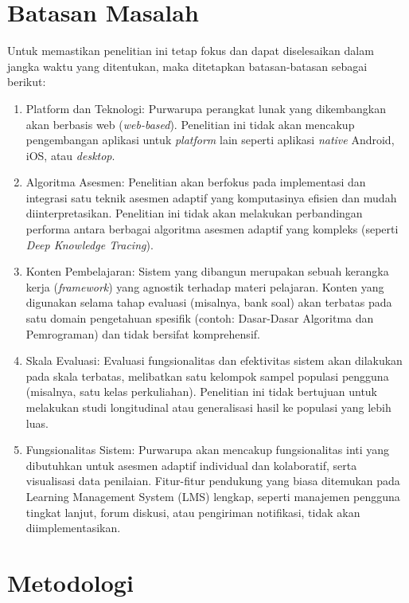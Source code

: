 \documentclass[12pt,a4paper,oneside]{book}
\begin{document}
\section{Batasan Masalah}
Untuk memastikan penelitian ini tetap fokus dan dapat diselesaikan dalam jangka waktu yang ditentukan, maka ditetapkan batasan-batasan sebagai berikut:
\begin{enumerate}
  \item Platform dan Teknologi: Purwarupa perangkat lunak yang dikembangkan akan berbasis web (\textit{web-based}). Penelitian ini tidak akan mencakup pengembangan aplikasi untuk \textit{platform} lain seperti aplikasi \textit{native} Android, iOS, atau \textit{desktop}.
  \item Algoritma Asesmen: Penelitian akan berfokus pada implementasi dan integrasi satu teknik asesmen adaptif yang komputasinya efisien dan mudah diinterpretasikan. Penelitian ini tidak akan melakukan perbandingan performa antara berbagai algoritma asesmen adaptif yang kompleks (seperti \textit{Deep Knowledge Tracing}).
  \item Konten Pembelajaran: Sistem yang dibangun merupakan sebuah kerangka kerja (\textit{framework}) yang agnostik terhadap materi pelajaran. Konten yang digunakan selama tahap evaluasi (misalnya, bank soal) akan terbatas pada satu domain pengetahuan spesifik (contoh: Dasar-Dasar Algoritma dan Pemrograman) dan tidak bersifat komprehensif.
  \item Skala Evaluasi: Evaluasi fungsionalitas dan efektivitas sistem akan dilakukan pada skala terbatas, melibatkan satu kelompok sampel populasi pengguna (misalnya, satu kelas perkuliahan). Penelitian ini tidak bertujuan untuk melakukan studi longitudinal atau generalisasi hasil ke populasi yang lebih luas.
  \item Fungsionalitas Sistem: Purwarupa akan mencakup fungsionalitas inti yang dibutuhkan untuk asesmen adaptif individual dan kolaboratif, serta visualisasi data penilaian. Fitur-fitur pendukung yang biasa ditemukan pada Learning Management System (LMS) lengkap, seperti manajemen pengguna tingkat lanjut, forum diskusi, atau pengiriman notifikasi, tidak akan diimplementasikan.
\end{enumerate}

\section{Metodologi}
\end{document}
